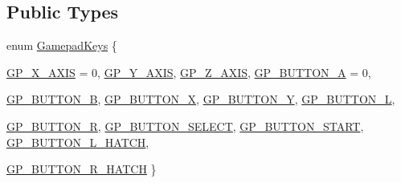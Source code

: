 \subsection*{Public Types}
\begin{DoxyCompactItemize}
\item 
enum \hyperlink{class_gamepad_controller_aa2a6f2322fe27329a1a4a77cf35000b4}{GamepadKeys} \{ \par
\hyperlink{class_gamepad_controller_aa2a6f2322fe27329a1a4a77cf35000b4a30c59da8731ead8f981a38d862664bb7}{GP\_\-X\_\-AXIS} =  0, 
\hyperlink{class_gamepad_controller_aa2a6f2322fe27329a1a4a77cf35000b4a5fec23e980381a919b31785de65b7905}{GP\_\-Y\_\-AXIS}, 
\hyperlink{class_gamepad_controller_aa2a6f2322fe27329a1a4a77cf35000b4abeaade299142d60f1ce727386ff1d653}{GP\_\-Z\_\-AXIS}, 
\hyperlink{class_gamepad_controller_aa2a6f2322fe27329a1a4a77cf35000b4ac5b30269f44138c055491c16d481f194}{GP\_\-BUTTON\_\-A} =  0, 
\par
\hyperlink{class_gamepad_controller_aa2a6f2322fe27329a1a4a77cf35000b4a1e5280510be9bea6cf4ab497729433cf}{GP\_\-BUTTON\_\-B}, 
\hyperlink{class_gamepad_controller_aa2a6f2322fe27329a1a4a77cf35000b4aae8397393de539e564947d585f673e57}{GP\_\-BUTTON\_\-X}, 
\hyperlink{class_gamepad_controller_aa2a6f2322fe27329a1a4a77cf35000b4a0dc723fae4fb3f8060ba5fb83928fc08}{GP\_\-BUTTON\_\-Y}, 
\hyperlink{class_gamepad_controller_aa2a6f2322fe27329a1a4a77cf35000b4ab3ad24c254f7374593168ea94a7a1a05}{GP\_\-BUTTON\_\-L}, 
\par
\hyperlink{class_gamepad_controller_aa2a6f2322fe27329a1a4a77cf35000b4ad12855e0a153507d7260df570c46698e}{GP\_\-BUTTON\_\-R}, 
\hyperlink{class_gamepad_controller_aa2a6f2322fe27329a1a4a77cf35000b4adb2043b202b439500b6d4cea7cf9cd12}{GP\_\-BUTTON\_\-SELECT}, 
\hyperlink{class_gamepad_controller_aa2a6f2322fe27329a1a4a77cf35000b4a63ef264bc68c70d6ff3a010b8b0967ea}{GP\_\-BUTTON\_\-START}, 
\hyperlink{class_gamepad_controller_aa2a6f2322fe27329a1a4a77cf35000b4a47b88cd63bd57c83b7c7d6cdedc2b260}{GP\_\-BUTTON\_\-L\_\-HATCH}, 
\par
\hyperlink{class_gamepad_controller_aa2a6f2322fe27329a1a4a77cf35000b4afba22a1e04fdf399caac955224d0099c}{GP\_\-BUTTON\_\-R\_\-HATCH}
 \}
\end{DoxyCompactItemize}
